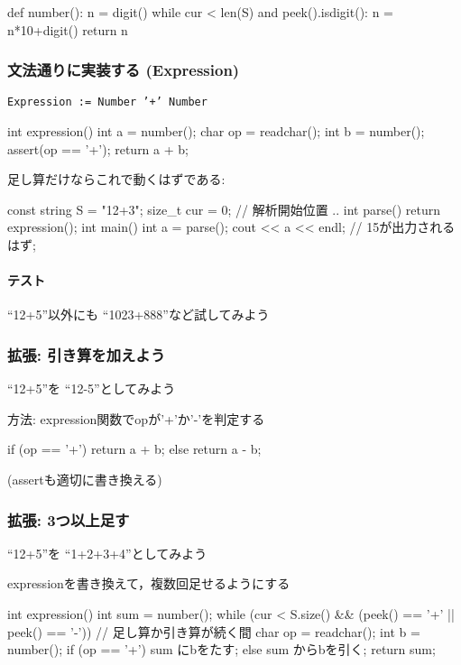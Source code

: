 \begin{pybox}[emph={number},emph={[2]digit}]
def number():
    n = digit()
    while cur < len(S) and peek().isdigit():
        n = n*10+digit()
    return n  
\end{pybox}

\subsubsection{文法通りに実装する (Expression)}
\texttt{\textcolor{ired}{Expression := Number '+' Number}}

\begin{cbox}[emph={expression},emph={[2]number}]
int expression() {
  int a = number();
  char op = readchar();
  int b = number();
  assert(op == '+');
  return a + b;
}
\end{cbox}

足し算だけならこれで動くはずである:
\begin{cbox}
const string S = "12+3";
size_t cur = 0; // 解析開始位置
.. 
int parse() { return expression(); }
int main() {
  int a = parse();
  cout << a << endl; // 15が出力されるはず;
}  
\end{cbox}

\paragraph{テスト}
``12+5''以外にも ``1023+888''など試してみよう

\subsubsection{拡張: 引き算を加えよう}
``12+5''を ``12-5''としてみよう

方法: expression関数でopが'+'か'-'を判定する
\begin{cbox}
  if (op == '+') return a + b;
  else return a - b;  
\end{cbox}
(assertも適切に書き換える)

\subsubsection{拡張: 3つ以上足す}
``12+5''を ``1+2+3+4''としてみよう

expressionを書き換えて，複数回足せるようにする
\begin{cbox}[emph={sum,while}]
int expression() {
    int sum = number();
    while (cur < S.size() && (peek() == '+' || peek() == '-')) {
        // 足し算か引き算が続く間
        char op = readchar();
        int b = number();
        if (op == '+') sum にbをたす;
        else sum からbを引く;
    }
    return sum;
}
\end{cbox}


